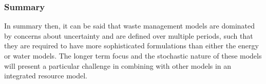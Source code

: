 \subsubsection*{Summary}
In summary then, it can be said that waste management models are dominated by concerns about uncertainty and are defined over multiple periods, such that they are required to have more sophisticated formulations than either the energy or water models. The longer term focus and the stochastic nature of these models will present a particular challenge in combining with other models in an integrated resource model.



